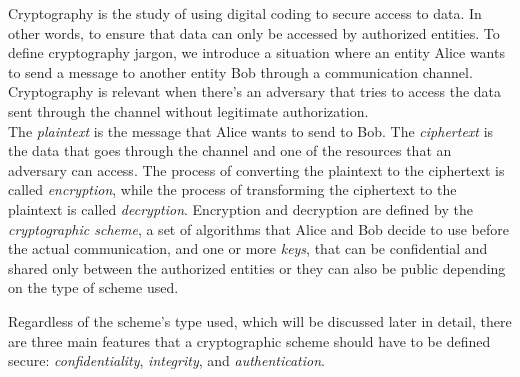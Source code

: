 Cryptography is the study of using digital coding to secure access to data. In other words, to ensure that data can only be accessed by authorized entities. To define cryptography jargon, we introduce a situation where an entity Alice wants to send a message to another entity Bob through a communication channel. Cryptography is relevant when there's an adversary that tries to access the data sent through the channel without legitimate authorization.\\
The \emph{plaintext} is the message that Alice wants to send to Bob. The \emph{ciphertext} is the data that goes through the channel and one of the resources that an adversary can access.
The process of converting the plaintext to the ciphertext is called \emph{encryption}, while the process of transforming the ciphertext to the plaintext is called \emph{decryption}.
Encryption and decryption are defined by the \emph{cryptographic scheme}, a set of algorithms that Alice and Bob decide to use before the actual communication, and one or more \emph{keys}, that can be confidential and shared only between the authorized entities or they can also be public depending on the type of scheme used.\par
Regardless of the scheme's type used, which will be discussed later in detail, there are three main features that a cryptographic scheme should have to be defined secure: \emph{confidentiality}, \emph{integrity}, and \emph{authentication}.
